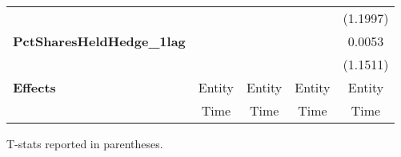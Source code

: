 \begin{center}
\begin{tabular}{lcccc}
\textbf{ }                                 &                     &                                &                     &             (1.1997)             \\
\textbf{PctSharesHeldHedge\_1lag}          &                     &                                &                     &              0.0053              \\
\textbf{ }                                 &                     &                                &                     &             (1.1511)             \\
\midrule
\textbf{Effects}                           &        Entity       &             Entity             &        Entity       &              Entity              \\
& Time & Time & Time & Time\\
\bottomrule
\end{tabular}
\end{center}
T-stats reported in parentheses.
